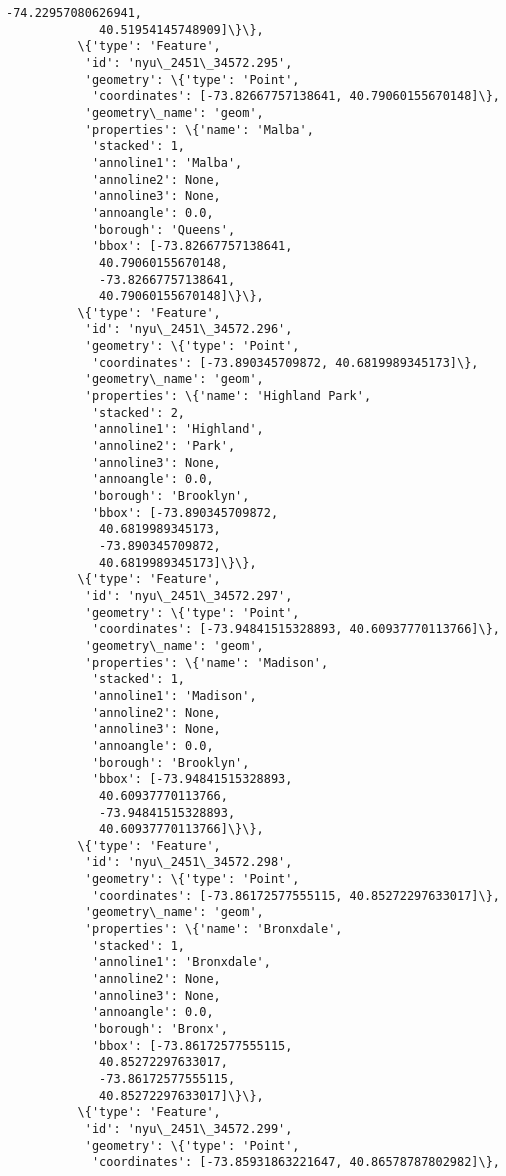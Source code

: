 \documentclass[11pt]{article}
\begin{document}
\begin{Verbatim}[commandchars=\\\{\}]
             -74.22957080626941,
             40.51954145748909]\}\},
          \{'type': 'Feature',
           'id': 'nyu\_2451\_34572.295',
           'geometry': \{'type': 'Point',
            'coordinates': [-73.82667757138641, 40.79060155670148]\},
           'geometry\_name': 'geom',
           'properties': \{'name': 'Malba',
            'stacked': 1,
            'annoline1': 'Malba',
            'annoline2': None,
            'annoline3': None,
            'annoangle': 0.0,
            'borough': 'Queens',
            'bbox': [-73.82667757138641,
             40.79060155670148,
             -73.82667757138641,
             40.79060155670148]\}\},
          \{'type': 'Feature',
           'id': 'nyu\_2451\_34572.296',
           'geometry': \{'type': 'Point',
            'coordinates': [-73.890345709872, 40.6819989345173]\},
           'geometry\_name': 'geom',
           'properties': \{'name': 'Highland Park',
            'stacked': 2,
            'annoline1': 'Highland',
            'annoline2': 'Park',
            'annoline3': None,
            'annoangle': 0.0,
            'borough': 'Brooklyn',
            'bbox': [-73.890345709872,
             40.6819989345173,
             -73.890345709872,
             40.6819989345173]\}\},
          \{'type': 'Feature',
           'id': 'nyu\_2451\_34572.297',
           'geometry': \{'type': 'Point',
            'coordinates': [-73.94841515328893, 40.60937770113766]\},
           'geometry\_name': 'geom',
           'properties': \{'name': 'Madison',
            'stacked': 1,
            'annoline1': 'Madison',
            'annoline2': None,
            'annoline3': None,
            'annoangle': 0.0,
            'borough': 'Brooklyn',
            'bbox': [-73.94841515328893,
             40.60937770113766,
             -73.94841515328893,
             40.60937770113766]\}\},
          \{'type': 'Feature',
           'id': 'nyu\_2451\_34572.298',
           'geometry': \{'type': 'Point',
            'coordinates': [-73.86172577555115, 40.85272297633017]\},
           'geometry\_name': 'geom',
           'properties': \{'name': 'Bronxdale',
            'stacked': 1,
            'annoline1': 'Bronxdale',
            'annoline2': None,
            'annoline3': None,
            'annoangle': 0.0,
            'borough': 'Bronx',
            'bbox': [-73.86172577555115,
             40.85272297633017,
             -73.86172577555115,
             40.85272297633017]\}\},
          \{'type': 'Feature',
           'id': 'nyu\_2451\_34572.299',
           'geometry': \{'type': 'Point',
            'coordinates': [-73.85931863221647, 40.86578787802982]\},

\end{Verbatim}
\end{document}
